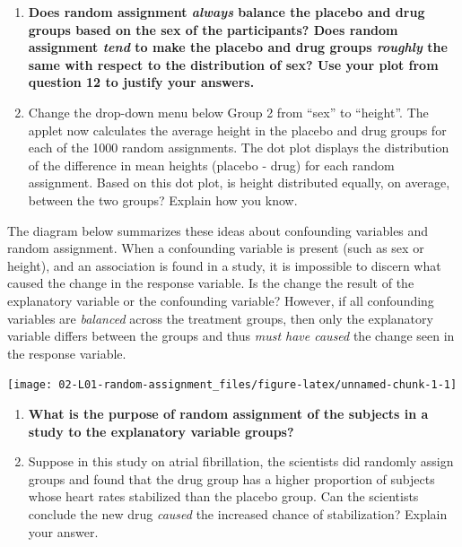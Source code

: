 \documentclass[
]{report}
\begin{document}
\newpage

\begin{enumerate}
\def\labelenumi{\arabic{enumi}.}
\setcounter{enumi}{12}
\item
  \textbf{Does random assignment \emph{always} balance the placebo and drug groups based on the sex of the participants? Does random assignment \emph{tend} to make the placebo and drug groups \emph{roughly} the same with respect to the distribution of sex? Use your plot from question 12 to justify your answers.}
  \vspace{0.5in}
\item
  Change the drop-down menu below Group 2 from ``sex'' to ``height''. The applet now calculates the average height in the placebo and drug groups for each of the 1000 random assignments. The dot plot displays the distribution of the difference in mean heights (placebo - drug) for each random assignment. Based on this dot plot, is height distributed equally, on average, between the two groups? Explain how you know.
  \vspace{0.5in}
\end{enumerate}

The diagram below summarizes these ideas about confounding variables and random assignment. When a confounding variable is present (such as sex or height), and an association is found in a study, it is impossible to discern what caused the change in the response variable. Is the change the result of the explanatory variable or the confounding variable? However, if all confounding variables are \emph{balanced} across the treatment groups, then only the explanatory variable differs between the groups and thus \emph{must have caused} the change seen in the response variable.

\begin{center}\texttt{[image: 02-L01-random-assignment\_files/figure-latex/unnamed-chunk-1-1]} \end{center}

\begin{enumerate}
\def\labelenumi{\arabic{enumi}.}
\setcounter{enumi}{14}
\item
  \textbf{What is the purpose of random assignment of the subjects in a study to the explanatory variable groups?}
  \vspace{0.8in}
\item
  Suppose in this study on atrial fibrillation, the scientists did randomly assign groups and found that the drug group has a higher proportion of subjects whose heart rates stabilized than the placebo group. Can the scientists conclude the new drug \emph{caused} the increased chance of stabilization? Explain your answer.
  \vspace{0.5in}
\end{enumerate}
\end{document}
